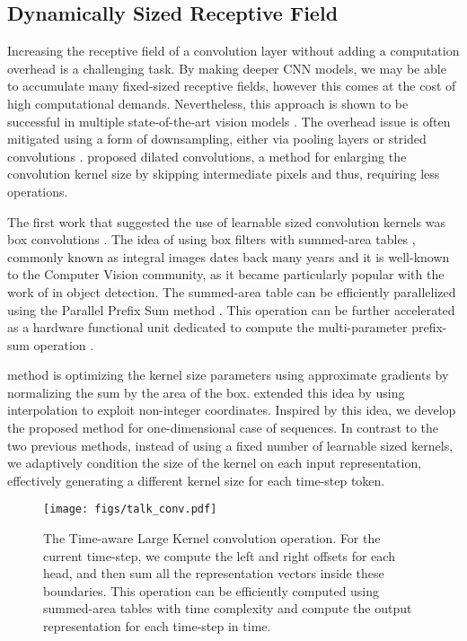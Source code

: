 \documentclass{article}
\begin{document}
\subsection{Dynamically Sized Receptive Field}
Increasing the receptive field of a convolution layer without adding a computation overhead is a challenging task. By making deeper CNN models, we may be able to accumulate many fixed-sized receptive fields, however this comes at the cost of high computational demands. Nevertheless, this approach is shown to be successful in multiple state-of-the-art vision models \cite{DBLP:journals/corr/HeZRS15,DBLP:journals/corr/SzegedyIV16}. The overhead issue is often mitigated using a form of downsampling, either via pooling layers \cite{726791} or strided convolutions \cite{springenberg2014striving}. \citet{yu2015multiscale} proposed dilated convolutions, a method for enlarging the convolution kernel size by skipping intermediate pixels and thus, requiring less  operations.

The first work that suggested the use of learnable sized convolution kernels was box convolutions \cite{NIPS2018_7859}. The idea of using box filters with summed-area tables \cite{crow1984summed}, commonly known as integral images dates back many years and it is well-known to the Computer Vision community, as it became particularly popular with the work of \citet{Viola01robustreal-time} in object detection. The summed-area table can be efficiently parallelized using the Parallel Prefix Sum method \cite{10.1145/322217.322232}. This operation can be further accelerated as a hardware functional unit dedicated to compute the multi-parameter prefix-sum operation \cite{18021}. 

\citet{NIPS2018_7859} method is optimizing the kernel size parameters using approximate gradients by normalizing the sum by the area of the box. \citet{zhang2019accelerating} extended this idea by using interpolation to exploit non-integer coordinates. 
Inspired by this idea, we develop the proposed method for one-dimensional case of sequences. 
In contrast to the two previous methods, instead of using a fixed number of learnable sized kernels, we adaptively condition the size of the kernel on each input representation, effectively generating a different kernel size for each time-step token.

\begin{figure}[t]
\centering
\texttt{[image: figs/talk\_conv.pdf]}
\caption{The Time-aware Large Kernel convolution operation. For the current time-step, we compute the left and right offsets for each head, and then sum all the representation vectors inside these boundaries. This operation can be efficiently computed using summed-area tables with time complexity  and compute the output representation for each time-step in  time.}
\label{fig:archs}
\end{figure}
\end{document}
